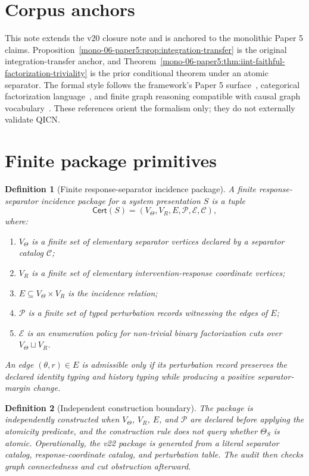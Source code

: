 \documentclass[11pt]{article}
\newtheorem{definition}{Definition}[section]
\newcommand{\VTheta}{V_{\Theta}}
\newcommand{\VR}{V_R}
\newcommand{\Cert}{\mathsf{Cert}}
\begin{document}
\section{Corpus anchors}
This note extends the v20 closure note and is anchored to the monolithic Paper 5 claims. Proposition~\ref{mono-06-paper5:prop:integration-transfer} is the original integration-transfer anchor, and Theorem~\ref{mono-06-paper5:thm:iint-faithful-factorization-triviality} is the prior conditional theorem under an atomic separator. The formal style follows the framework's Paper 5 surface~\cite{paper5}, categorical factorization language~\cite{maclane1998}, and finite graph reasoning compatible with causal graph vocabulary~\cite{pearl2009}. These references orient the formalism only; they do not externally validate QICN.

\section{Finite package primitives}

\begin{definition}[Finite response-separator incidence package]
A finite response-separator incidence package for a system presentation $S$ is a tuple
\[
  \Cert(S)=(\VTheta,\VR,E,\mathcal P,\mathcal E,\mathcal C),
\]
where:
\begin{enumerate}[label=(\roman*)]
  \item $\VTheta$ is a finite set of elementary separator vertices declared by a separator catalog $\mathcal C$;
  \item $\VR$ is a finite set of elementary intervention-response coordinate vertices;
  \item $E\subseteq \VTheta\times\VR$ is the incidence relation;
  \item $\mathcal P$ is a finite set of typed perturbation records witnessing the edges of $E$;
  \item $\mathcal E$ is an enumeration policy for non-trivial binary factorization cuts over $\VTheta\sqcup\VR$.
\end{enumerate}
An edge $(\theta,r)\in E$ is admissible only if its perturbation record preserves the declared identity typing and history typing while producing a positive separator-margin change.
\end{definition}

\begin{definition}[Independent construction boundary]
The package is independently constructed when $\VTheta$, $\VR$, $E$, and $\mathcal P$ are declared before applying the atomicity predicate, and the construction rule does not query whether $\Theta_S$ is atomic. Operationally, the v22 package is generated from a literal separator catalog, response-coordinate catalog, and perturbation table. The audit then checks graph connectedness and cut obstruction afterward.
\end{definition}
\end{document}
